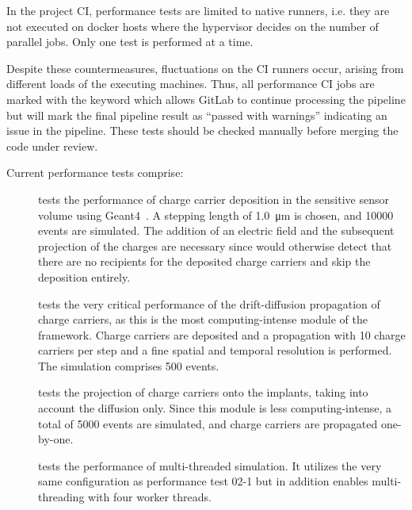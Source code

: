 In the project CI, performance tests are limited to native runners, i.e. they are not executed on docker hosts where the hypervisor decides on the number of parallel jobs.
Only one test is performed at a time.

Despite these countermeasures, fluctuations on the CI runners occur, arising from different loads of the executing machines.
Thus, all performance CI jobs are marked with the  keyword which allows GitLab to continue processing the pipeline but will mark the final pipeline result as ``passed with warnings'' indicating an issue in the pipeline.
These tests should be checked manually before merging the code under review.

Current performance tests comprise:

\begin{description}
    \item[] tests the performance of charge carrier deposition in the sensitive sensor volume using Geant4~\cite{geant4}. A stepping length of \SI{1.0}{\um} is chosen, and \num{10000} events are simulated. The addition of an electric field and the subsequent projection of the charges are necessary since \apsq would otherwise detect that there are no recipients for the deposited charge carriers and skip the deposition entirely.
    \item[] tests the very critical performance of the drift-diffusion propagation of charge carriers, as this is the most computing-intense module of the framework. Charge carriers are deposited and a propagation with 10 charge carriers per step and a fine spatial and temporal resolution is performed. The simulation comprises \num{500} events.
    \item[] tests the projection of charge carriers onto the implants, taking into account the diffusion only. Since this module is less computing-intense, a total of \num{5000} events are simulated, and charge carriers are propagated one-by-one.
    \item[] tests the performance of multi-threaded simulation. It utilizes the very same configuration as performance test 02-1 but in addition enables multi-threading with four worker threads.
\end{description}
